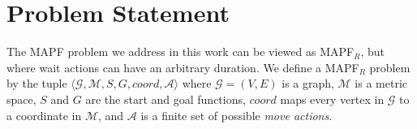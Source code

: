 \documentclass[review]{elsarticle}
\newcommand{\target}{\ensuremath{G}\xspace}
\newcommand{\source}{\ensuremath{S}\xspace}
\newcommand\konstantin[1]{\nb{\textbf{Konstantin:}}{red}{#1}}
\newcommand{\mapfr}{\ac{MAPF}$_R$\xspace}
\newcommand{\mapf}{\ac{MAPF}\xspace}
\newcommand{\true}{\textit{true}\xspace}
\newcommand{\false}{\textit{false}\xspace}
\newcommand{\coord}{\textit{coord}\xspace}
\newcommand{\iscollision}{\textsc{IsCollision}\xspace}
\begin{document}
\section{Problem Statement}

The \mapf problem we address in this work can be viewed as \mapfr, but where wait actions can have an arbitrary duration.  
We define a \mapfr problem by the tuple $\langle \mathcal{G}, \mathcal{M}, \source, \target, \coord, \mathcal{A}\rangle$ 
where $\mathcal{G}=(V,E)$ is a graph, 
$\mathcal{M}$ is a metric space, 
$\source$ and $\target$ are the start and goal functions, 
$\coord$ maps every vertex in $\mathcal{G}$ to a coordinate in $\mathcal{M}$, 
and $\mathcal{A}$ is a finite set of possible \emph{move actions}.



\end{document}
